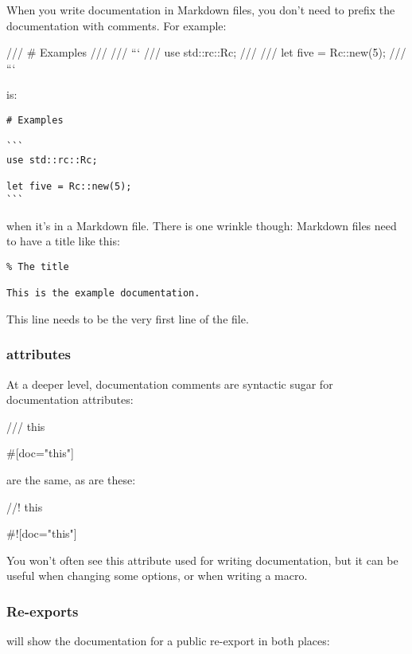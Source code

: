 \blank

When you write documentation in Markdown files, you don't need to prefix the documentation with comments. For example:

\begin{rustc}
/// # Examples
///
/// ```
/// use std::rc::Rc;
///
/// let five = Rc::new(5);
/// ```
\end{rustc}

is:

\begin{verbatim}
# Examples

```
use std::rc::Rc;

let five = Rc::new(5);
```
\end{verbatim}

when it's in a Markdown file. There is one wrinkle though: Markdown files need to have a title like this:

\begin{verbatim}
% The title

This is the example documentation.
\end{verbatim}

This \code{\%} line needs to be the very first line of the file.

\subsubsection*{ attributes}

At a deeper level, documentation comments are syntactic sugar for documentation attributes:

\begin{rustc}
/// this

#[doc="this"]
\end{rustc}

are the same, as are these:

\begin{rustc}
//! this

#![doc="this"]
\end{rustc}

You won't often see this attribute used for writing documentation, but it can be useful when changing some options, or when writing a macro.

\subsubsection*{Re-exports}

 will show the documentation for a public re-export in both places:

